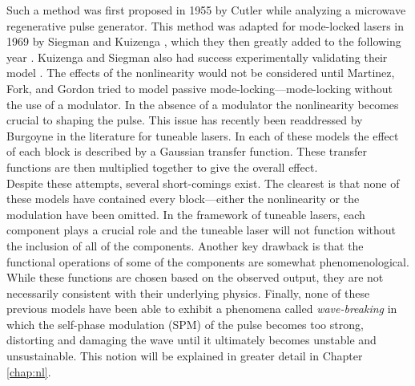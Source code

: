 Such a method was first proposed in 1955 by Cutler \cite{cutler} while analyzing a microwave regenerative pulse generator. This method was adapted for mode-locked lasers in 1969 by Siegman and Kuizenga \cite{siegman}, which they then greatly added to the following year \cite{kuizenga1970a}. Kuizenga and Siegman also had success experimentally validating their model \cite{kuizenga1970b, kuizenga1970}. The effects of the nonlinearity would not be considered until Martinez, Fork, and Gordon \cite{martinez1984, martinez1985} tried to model passive mode-locking---mode-locking without the use of a modulator. In the absence of a modulator the nonlinearity becomes crucial to shaping the pulse. This issue has recently been readdressed by Burgoyne \cite{burgoyne2014} in the literature for tuneable lasers. In each of these models the effect of each block is described by a Gaussian transfer function. These transfer functions are then multiplied together to give the overall effect. \\

Despite these attempts, several short-comings exist. The clearest is that none of these models have contained every block---either the nonlinearity or the modulation have been omitted. In the framework of tuneable lasers, each component plays a crucial role and the tuneable laser will not function without the inclusion of all of the components. Another key drawback is that the functional operations of some of the components are somewhat phenomenological. While these functions are chosen based on the observed output, they are not necessarily consistent with their underlying physics. Finally, none of these previous models have been able to exhibit a phenomena called \emph{wave-breaking} in which the self-phase modulation (SPM) of the pulse becomes too strong, distorting and damaging the wave until it ultimately becomes unstable and unsustainable. This notion will be explained in greater detail in Chapter \ref{chap:nl}. \\
